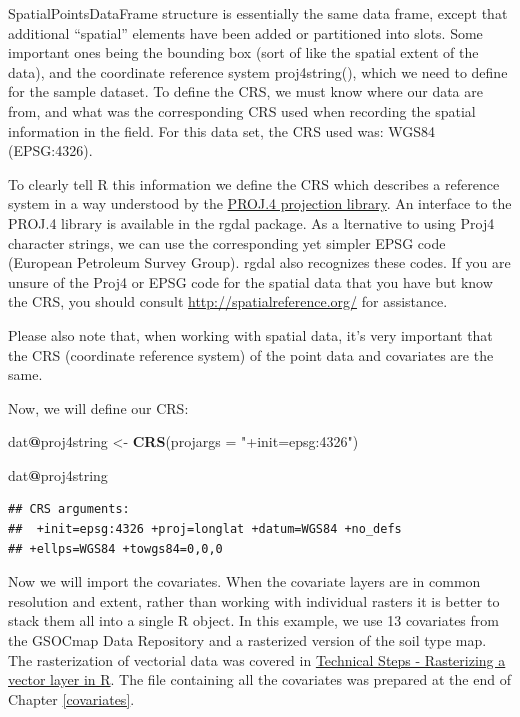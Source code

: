 \documentclass[10pt,b5paper,]{book}
\newenvironment{Shaded}{\begin{snugshade}}{\end{snugshade}}
\newcommand{\DataTypeTok}[1]{\textcolor[rgb]{0.13,0.29,0.53}{#1}}
\newcommand{\KeywordTok}[1]{\textcolor[rgb]{0.13,0.29,0.53}{\textbf{#1}}}
\newcommand{\NormalTok}[1]{#1}
\newcommand{\OperatorTok}[1]{\textcolor[rgb]{0.81,0.36,0.00}{\textbf{#1}}}
\newcommand{\StringTok}[1]{\textcolor[rgb]{0.31,0.60,0.02}{#1}}
\theoremstyle{definition}
\theoremstyle{definition}
\theoremstyle{definition}
\theoremstyle{remark}
\begin{document}
SpatialPointsDataFrame structure is essentially the same data frame,
except that additional ``spatial'' elements have been added or
partitioned into slots. Some important ones being the bounding box (sort
of like the spatial extent of the data), and the coordinate reference
system proj4string(), which we need to define for the sample dataset. To
define the CRS, we must know where our data are from, and what was the
corresponding CRS used when recording the spatial information in the
field. For this data set, the CRS used was: WGS84 (EPSG:4326).

To clearly tell R this information we define the CRS which describes a
reference system in a way understood by the
\href{http://trac.osgeo.org/proj/}{PROJ.4 projection library}. An
interface to the PROJ.4 library is available in the rgdal package. As a
lternative to using Proj4 character strings, we can use the
corresponding yet simpler EPSG code (European Petroleum Survey Group).
rgdal also recognizes these codes. If you are unsure of the Proj4 or
EPSG code for the spatial data that you have but know the CRS, you
should consult \url{http://spatialreference.org/} for assistance.

Please also note that, when working with spatial data, it's very
important that the CRS (coordinate reference system) of the point data
and covariates are the same.

Now, we will define our CRS:

\begin{Shaded}
\begin{Highlighting}[]
\NormalTok{dat}\OperatorTok{@}\NormalTok{proj4string <-}\StringTok{ }\KeywordTok{CRS}\NormalTok{(}\DataTypeTok{projargs =} \StringTok{"+init=epsg:4326"}\NormalTok{)}

\NormalTok{dat}\OperatorTok{@}\NormalTok{proj4string}
\end{Highlighting}
\end{Shaded}

\begin{verbatim}
## CRS arguments:
##  +init=epsg:4326 +proj=longlat +datum=WGS84 +no_defs
## +ellps=WGS84 +towgs84=0,0,0
\end{verbatim}

Now we will import the covariates. When the covariate layers are in
common resolution and extent, rather than working with individual
rasters it is better to stack them all into a single R object. In this
example, we use 13 covariates from the GSOCmap Data Repository and a
rasterized version of the soil type map. The rasterization of vectorial
data was covered in
\protect\hyperlink{technical-steps---rasterizing-a-vector-layer-in-r}{Technical
Steps - Rasterizing a vector layer in R}. The file containing all the
covariates was prepared at the end of Chapter \ref{covariates}.
\end{document}
